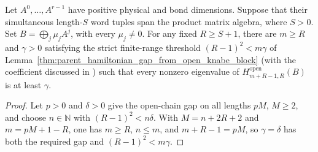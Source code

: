 \begin{lemma}
    \label{thm:block_strict_knabe_window_simultaneous_injectivity}
    \leanok
    Let $A^0,\ldots,A^{r-1}$ have positive physical and bond dimensions.
    Suppose that their simultaneous length-$S$ word tuples span the product
    matrix algebra, where $S>0$. Set $B=\bigoplus_j\mu_jA^j$, with
    every $\mu_j\neq0$. For any fixed $R\geq S+1$, there are $m\geq R$ and
    $\gamma>0$ satisfying the strict finite-range threshold $(R-1)^2<m\gamma$
    of Lemma~\ref{thm:parent_hamiltonian_gap_from_open_knabe_block} (with
    the coefficient discussed in
    ) such that
    every nonzero eigenvalue of $H^{\mathrm{open}}_{m+R-1,R}(B)$ is at least
    $\gamma$.
\end{lemma}
\begin{proof}
    \leanok
    Let $p>0$ and $\delta>0$ give the open-chain gap on all lengths
    $pM$, $M\geq2$, and choose $n\in\mathbb N$ with $(R-1)^2<n\delta$.
    With $M=n+2R+2$ and $m=pM+1-R$, one has $m\geq R$, $n\leq m$,
    and $m+R-1=pM$, so $\gamma=\delta$ has both the required gap and
    $(R-1)^2<m\gamma$.
\end{proof}

